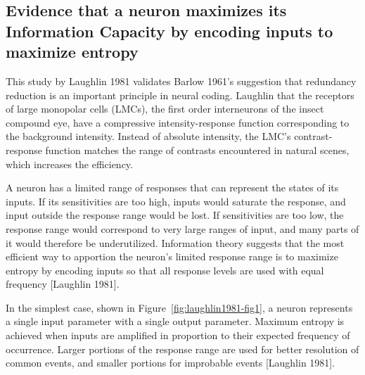 \documentclass[twoside]{article}
\begin{document}
\begin{multicols}{2}

\section{Evidence that a neuron maximizes its Information Capacity by encoding inputs to maximize entropy}

This study by Laughlin 1981 validates Barlow 1961's suggestion that redundancy reduction is an important principle in neural coding. Laughlin that the receptors of large monopolar cells (LMCs), the first order interneurons of the insect compound eye, have a compressive intensity-response function corresponding to the background intensity. Instead of absolute intensity, the LMC's contrast-response function matches the range of contrasts encountered in natural scenes, which increases the efficiency.

A neuron has a limited range of responses that can represent the states of its inputs. If its sensitivities are too high, inputs would saturate the response, and input outside the response range would be lost. If sensitivities are too low, the response range would correspond to very large ranges of input, and many parts of it would therefore be underutilized. Information theory suggests that the most efficient way to apportion the neuron's limited response range is to maximize entropy by encoding inputs so that all response levels are used with equal frequency [Laughlin 1981]. 

In the simplest case, shown in Figure~\ref{fig:laughlin1981-fig1}, a neuron represents a single input parameter with a single output parameter. Maximum entropy is achieved when inputs are amplified in proportion to their expected frequency of occurrence. Larger portions of the response range are used for better resolution of common events, and smaller portions for improbable events [Laughlin 1981]. 


\end{multicols}
\end{document}
